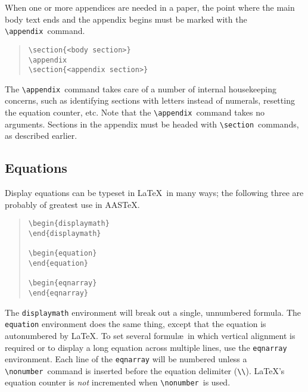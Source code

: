 \documentclass[preprint2]{aastex}
\begin{document}
When one or more appendices are needed in a paper, the point where the 
main body text ends and the appendix begins must be marked 
with the \verb"\appendix"\ 
 command. 
\begin{quote} 
\begin{verbatim} 
\section{<body section>} 
\appendix 
\section{<appendix section>} 
\end{verbatim} 
\end{quote} 
The \verb"\appendix"\ 
 command takes care of a number of internal 
housekeeping concerns, such as identifying sections with letters 
instead of numerals, resetting the equation counter, etc. 
Note that the \verb"\appendix"\ 
 command takes no arguments. 
Sections in the appendix must be headed with \verb"\section"\ 
 commands, as described earlier. 
 
\subsection{Equations} 
 
Display equations can be typeset in \LaTeX\ in many ways; 
the following three are probably of greatest use in AASTeX. 
\begin{quote} 
\begin{verbatim} 
\begin{displaymath} 
\end{displaymath} 
 
\begin{equation} 
\end{equation} 
 
\begin{eqnarray} 
\end{eqnarray} 
\end{verbatim} 
\end{quote} 
The 
\texttt{displaymath}  environment 
will break out a single, 
unnumbered formula.  The \texttt{equation} environment does the same 
thing, except that the equation is 
autonumbered by \LaTeX. 
To set several formul\ae\ in which vertical alignment 
is required or to display a long equation across multiple lines, use the 
\texttt{eqnarray} environment. Each line of the \texttt{eqnarray} 
will be numbered 
unless a \verb"\nonumber"\ 
 command is inserted 
before the equation delimiter 
(\verb"\\"). 
\LaTeX's equation counter is \emph{not} incremented when 
\verb"\nonumber"\ 
 is used. 
 
\end{document}
